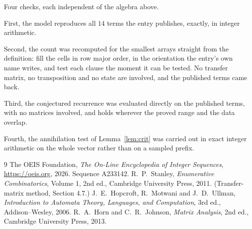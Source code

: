 \documentclass[11pt,a4paper]{article}
\theoremstyle{plain}
\theoremstyle{definition}
\begin{document}
Four checks, each independent of the algebra above.

First, the model reproduces all $14$ terms the entry publishes, exactly, in integer
arithmetic.

Second, the count was recomputed for the smallest arrays straight from the definition: fill the
cells in row major order, in the orientation the entry's own name writes, and test each clause
the moment it can be tested. No transfer matrix, no transposition and no state are involved,
and the published terms came back.

Third, the conjectured recurrence was evaluated directly on the published terms, with no
matrices involved, and holds wherever the proved range and the data overlap.

Fourth, the annihilation test of Lemma~\ref{lem:crit} was carried out in exact integer
arithmetic on the whole vector rather than on a sampled prefix.

\begin{thebibliography}{9}
 The OEIS Foundation, \emph{The On-Line Encyclopedia of Integer
Sequences}, \url{https://oeis.org}, 2026. Sequence A233142.
 R.~P.~Stanley, \emph{Enumerative Combinatorics}, Volume 1, 2nd ed.,
Cambridge University Press, 2011. (Transfer-matrix method, Section 4.7.)
 J.~E.~Hopcroft, R.~Motwani and J.~D.~Ullman, \emph{Introduction to Automata
Theory, Languages, and Computation}, 3rd ed., Addison--Wesley, 2006.
 R.~A.~Horn and C.~R.~Johnson, \emph{Matrix Analysis}, 2nd ed., Cambridge
University Press, 2013.
\end{thebibliography}
\end{document}
